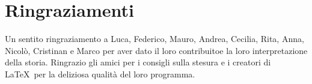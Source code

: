 
\begingroup
\let\clearpage\relax
\let\cleardoublepage\relax
\let\cleardoublepage\relax

\chapter*{Ringraziamenti}
Un sentito ringraziamento a Luca, Federico, Mauro, Andrea, Cecilia, Rita, Anna, Nicol\`o, Cristinan e Marco per aver dato il loro contribuitoe la loro interpretazione della storia. Ringrazio gli amici per i consigli sulla stesura e i creatori di \LaTeX\ per la deliziosa qualit\`a del loro programma.
\endgroup



